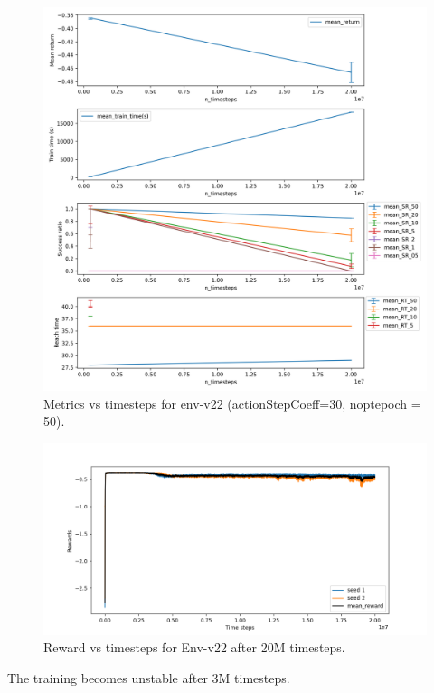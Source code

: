 \documentclass{article}
\begin{document}
\begin{figure}[H]
    \centering
    \includegraphics[width=\textwidth]{../n_timesteps_env22.png}
\caption{Metrics vs timesteps for env-v22 (actionStepCoeff=30, noptepoch = 50).}
\end{figure}



\begin{figure}[H]
    \centering
    \includegraphics[width=\textwidth]{../reward_vs_timesteps_smoothed_env22.png}
\caption{Reward vs timesteps for Env-v22 after 20M timesteps.}
\end{figure}

The training becomes unstable after 3M timesteps.
\end{document}
